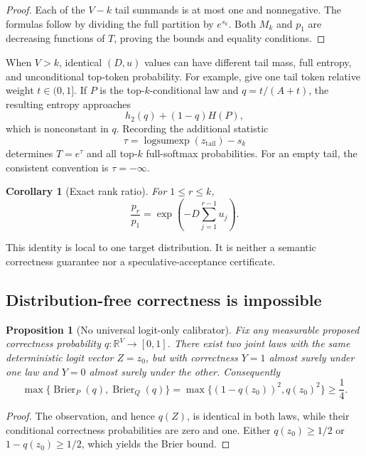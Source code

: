 \documentclass[11pt]{article}
\newtheorem{proposition}[theorem]{Proposition}
\newtheorem{corollary}[theorem]{Corollary}
\theoremstyle{definition}
\theoremstyle{remark}
\newcommand{\R}{\mathbb{R}}
\newcommand{\1}{\mathbf{1}}
\begin{document}
\begin{proof}
Each of the $V-k$ tail summands is at most one and nonnegative.  The formulas
follow by dividing the full partition by $e^{s_k}$.  Both $M_k$ and $p_1$ are
decreasing functions of $T$, proving the bounds and equality conditions.
\end{proof}

When $V>k$, identical $(D,u)$ values can have different tail mass, full
entropy, and unconditional top-token probability.  For example, give one tail
token relative weight $t\in(0,1]$.  If $P$ is the top-$k$-conditional law and
$q=t/(A+t)$, the resulting entropy approaches
\[
  h_2(q)+(1-q)H(P),
\]
which is nonconstant in $q$.  Recording the additional statistic
\[
 \tau=\operatorname{logsumexp}(z_{\mathrm{tail}})-s_k
\]
determines $T=e^\tau$ and all top-$k$ full-softmax probabilities.  For an empty
tail, the consistent convention is $\tau=-\infty$.

\begin{corollary}[Exact rank ratio]\label{cor:rank-ratio}
For $1\leq r\leq k$,
\[
  \frac{p_r}{p_1}
  =\exp\left(-D\sum_{j=1}^{r-1}u_j\right).
\]
\end{corollary}

This identity is local to one target distribution.  It is neither a semantic
correctness guarantee nor a speculative-acceptance certificate.

\subsection{Distribution-free correctness is impossible}

\begin{proposition}[No universal logit-only calibrator]\label{prop:no-free-lunch}
Fix any measurable proposed correctness probability
$q:\R^V\to[0,1]$.  There exist two joint laws with the same deterministic
logit vector $Z=z_0$, but with correctness $Y=1$ almost surely under one law
and $Y=0$ almost surely under the other.  Consequently
\[
 \max\{\operatorname{Brier}_P(q),\operatorname{Brier}_Q(q)\}
 =\max\{(1-q(z_0))^2,q(z_0)^2\}\geq\frac14.
\]
\end{proposition}

\begin{proof}
The observation, and hence $q(Z)$, is identical in both laws, while their
conditional correctness probabilities are zero and one.  Either
$q(z_0)\geq1/2$ or $1-q(z_0)\geq1/2$, which yields the Brier bound.
\end{proof}
\end{document}
